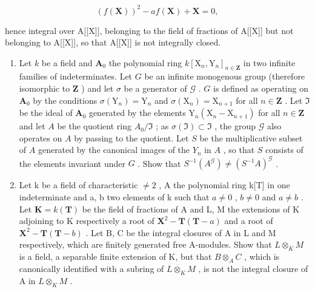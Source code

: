 \[
(f (\mathbf {X})) ^ {2} - a f (\mathbf {X}) + \mathbf {X} = 0,
\]

hence integral over A{[}{[}X{]}{]}, belonging to the field of fractions of A{[}{[}X{]}{]} but not belonging to A{[}{[}X{]}{]}, so that A{[}{[}X{]}{]} is not integrally closed.

\begin{enumerate}
\def\labelenumi{\arabic{enumi}.}
\setcounter{enumi}{27}
\item
  Let \(k\) be a field and \(\mathbf{A}_0\) the polynomial ring \(k[\mathrm{X}_n, \mathrm{Y}_n]_{n \in \mathbf{Z}}\) in two infinite families of indeterminates. Let \(G\) be an infinite monogenous group (therefore isomorphic to \(\mathbf{Z}\) ) and let \(\sigma\) be a generator of \(\mathcal{G}\) . \(G\) is defined as operating on \(\mathbf{A}_0\) by the conditions \(\sigma(\mathrm{Y}_n) = \mathrm{Y}_n\) and \(\sigma(\mathrm{X}_n) = \mathrm{X}_{n+1}\) for all \(n \in \mathbf{Z}\) . Let \(\Im\) be the ideal of \(\mathbf{A}_0\) generated by the elements \(\mathrm{Y}_n(\mathrm{X}_n - \mathrm{X}_{n+1})\) for all \(n \in \mathbf{Z}\) and let \(A\) be the quotient ring \(A_0 / \Im\) ; as \(\sigma(\Im) \subset \Im\) , the group \(\mathcal{G}\) also operates on \(A\) by passing to the quotient. Let \(S\) be the multiplicative subset of \(A\) generated by the canonical images of the \(Y_n\) in \(A\) , so that \(S\) consists of the elements invariant under \(G\) . Show that \(S^{-1}(A^{\mathcal{G}}) \neq (S^{-1}A)^{\mathcal{G}}\) .
\item
  Let k be a field of characteristic \(\neq2\) , A the polynomial ring k{[}T{]} in one indeterminate and a, b two elements of k such that \(a\neq0\) , \(b\neq0\) and \(a\neq b\) . Let \(\mathbf{K}=k(\mathbf{T})\) be the field of fractions of A and L, M the extensions of K adjoining to K respectively a root of \(\mathbf{X}^{2}-\mathbf{T}(\mathbf{T}-a)\) and a root of \(\mathbf{X}^{2}-\mathbf{T}(\mathbf{T}-b)\) . Let B, C be the integral closures of A in L and M respectively, which are finitely generated free A-modules. Show that \(L\otimes_{K}M\) is a field, a separable finite extension of K, but that \(B\otimes_{A}C\) , which is canonically identified with a subring of \(L\otimes_{K}M\) , is not the integral closure of A in \(L\otimes_{K}M\) .
\end{enumerate}
\relax{}
